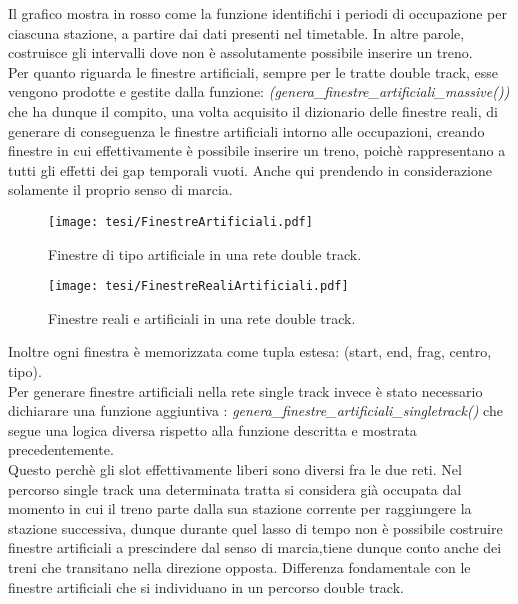 \documentclass{report}
\begin{document}
 Il grafico mostra in rosso come la funzione identifichi i periodi di occupazione per ciascuna stazione, a partire dai dati presenti nel timetable. In altre parole, costruisce gli intervalli dove non è assolutamente possibile inserire un treno. \\
Per quanto riguarda le finestre artificiali, sempre per le tratte double track, esse vengono prodotte e gestite dalla funzione: 
\textit{(genera\_finestre\_artificiali\_massive())} che ha dunque il compito, una volta acquisito il dizionario delle finestre reali, di generare di conseguenza le finestre artificiali intorno alle occupazioni, creando finestre in cui effettivamente è possibile inserire un treno, poichè rappresentano a tutti gli effetti dei gap temporali vuoti. Anche qui prendendo in considerazione solamente il proprio senso di marcia. 

\begin{figure} [H]
    \centering
    \texttt{[image: tesi/FinestreArtificiali.pdf]}
    \caption{Finestre di tipo artificiale in una rete double track.}
    \label{fig:placeholder}
\end{figure}

\begin{figure} [H]
    \centering
    \texttt{[image: tesi/FinestreRealiArtificiali.pdf]}
    \caption{Finestre reali e artificiali in una rete double track.}
    \label{fig:placeholder}
\end{figure}

Inoltre ogni finestra è memorizzata come tupla estesa: (start, end, frag, centro, tipo). \\ Per generare finestre artificiali nella rete single track invece è stato necessario dichiarare una funzione aggiuntiva : \textit{genera\_finestre\_artificiali\_singletrack()} che segue una logica diversa rispetto alla funzione descritta e mostrata precedentemente. \\ Questo perchè gli slot effettivamente liberi sono diversi fra le due reti.
 Nel percorso single track una determinata tratta si considera già occupata dal momento in cui il treno parte dalla sua stazione corrente per raggiungere la stazione successiva, dunque durante quel lasso di tempo non è possibile costruire finestre artificiali a prescindere dal senso di marcia,tiene dunque conto anche dei treni che transitano nella direzione opposta. Differenza fondamentale con le finestre artificiali che si individuano in un percorso double track.
\end{document}
